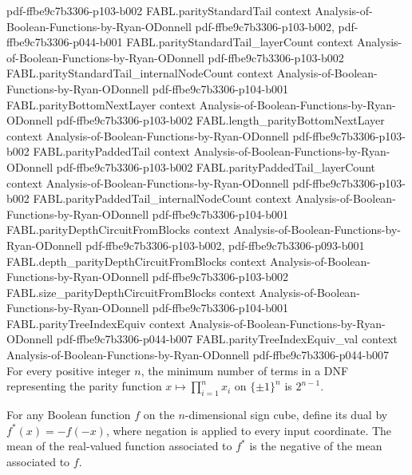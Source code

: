 \begin{theorem}
  {pdf-ffbe9c7b3306-p103-b002}
\proofstep
  {FABL.parityStandardTail}
  {context}
  {Analysis-of-Boolean-Functions-by-Ryan-ODonnell}
  {pdf-ffbe9c7b3306-p103-b002,
    pdf-ffbe9c7b3306-p044-b001}
\proofstep
  {FABL.parityStandardTail_layerCount}
  {context}
  {Analysis-of-Boolean-Functions-by-Ryan-ODonnell}
  {pdf-ffbe9c7b3306-p103-b002}
\proofstep
  {FABL.parityStandardTail_internalNodeCount}
  {context}
  {Analysis-of-Boolean-Functions-by-Ryan-ODonnell}
  {pdf-ffbe9c7b3306-p104-b001}
\proofstep
  {FABL.parityBottomNextLayer}
  {context}
  {Analysis-of-Boolean-Functions-by-Ryan-ODonnell}
  {pdf-ffbe9c7b3306-p103-b002}
\proofstep
  {FABL.length_parityBottomNextLayer}
  {context}
  {Analysis-of-Boolean-Functions-by-Ryan-ODonnell}
  {pdf-ffbe9c7b3306-p103-b002}
\proofstep
  {FABL.parityPaddedTail}
  {context}
  {Analysis-of-Boolean-Functions-by-Ryan-ODonnell}
  {pdf-ffbe9c7b3306-p103-b002}
\proofstep
  {FABL.parityPaddedTail_layerCount}
  {context}
  {Analysis-of-Boolean-Functions-by-Ryan-ODonnell}
  {pdf-ffbe9c7b3306-p103-b002}
\proofstep
  {FABL.parityPaddedTail_internalNodeCount}
  {context}
  {Analysis-of-Boolean-Functions-by-Ryan-ODonnell}
  {pdf-ffbe9c7b3306-p104-b001}
\proofstep
  {FABL.parityDepthCircuitFromBlocks}
  {context}
  {Analysis-of-Boolean-Functions-by-Ryan-ODonnell}
  {pdf-ffbe9c7b3306-p103-b002,
    pdf-ffbe9c7b3306-p093-b001}
\proofstep
  {FABL.depth_parityDepthCircuitFromBlocks}
  {context}
  {Analysis-of-Boolean-Functions-by-Ryan-ODonnell}
  {pdf-ffbe9c7b3306-p103-b002}
\proofstep
  {FABL.size_parityDepthCircuitFromBlocks}
  {context}
  {Analysis-of-Boolean-Functions-by-Ryan-ODonnell}
  {pdf-ffbe9c7b3306-p104-b001}
\proofstep
  {FABL.parityTreeIndexEquiv}
  {context}
  {Analysis-of-Boolean-Functions-by-Ryan-ODonnell}
  {pdf-ffbe9c7b3306-p044-b007}
\proofstep
  {FABL.parityTreeIndexEquiv_val}
  {context}
  {Analysis-of-Boolean-Functions-by-Ryan-ODonnell}
  {pdf-ffbe9c7b3306-p044-b007}
For every positive integer $n$, the minimum number of terms in a DNF representing the
parity function $x\mapsto\prod_{i=1}^n x_i$ on $\{\pm1\}^n$ is $2^{n-1}$.
\end{theorem}

\begin{theorem}
\label{FABL.mean_booleanDual}
\leanok
{}
For any Boolean function $f$ on the $n$-dimensional sign cube, define its dual by
$f^*(x)=-f(-x)$, where negation is applied to every input coordinate. The mean of the
real-valued function associated to $f^*$ is the negative of the mean associated to $f$.
\end{theorem}

